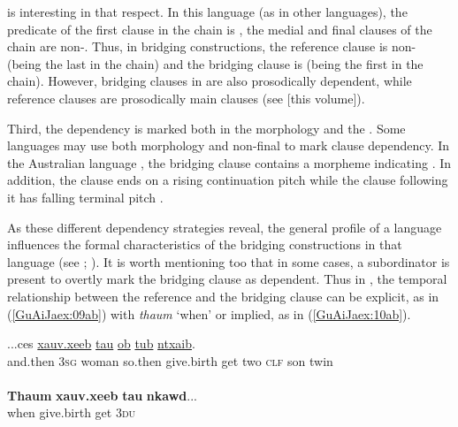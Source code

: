 \documentclass[output=paper]{LSP/langsci}
\begin{document}
 is interesting in that respect. In this language (as in other  languages), the predicate of the first clause in the chain is , the medial and final clauses of the chain are non-. Thus, in  bridging constructions, the reference clause is non- (being the last in the chain) and the bridging clause is  (being the first in the chain). However, bridging clauses in  are also prosodically dependent, while reference clauses are prosodically main clauses (see \citealt{chapters/03Sarvasy} [this volume]).

Third, the dependency is marked both in the morphology and the . Some languages may use both morphology and non-final  to mark clause dependency. In the Australian language , the bridging clause contains a morpheme indicating . In addition, the clause ends on a rising continuation pitch while the clause following it has falling terminal pitch \citep[99]{heath1985}. 

As these different dependency strategies reveal, the general profile of a language influences the formal characteristics of the bridging constructions in that language (see  \citealt{devries.2005}; \citealt[][898]{seifart10}). It is worth mentioning too that in some cases, a subordinator is present to overtly mark the bridging clause as dependent. Thus in , the temporal relationship between the reference and the bridging clause can be explicit, as in (\ref{GuAiJaex:09ab}) with \textit{thaum} `when' or implied, as in (\ref{GuAiJaex:10ab}). 


\begin{exe}
\ex \label{GuAiJaex:09ab}
\begin{xlist}
\ex \label{GuAiJaex:09a}
\gll ...ces \underline{} \underline{} \underline{} \underline{xauv.xeeb} \underline{tau} \underline{ob} \underline{} \underline{tub} \underline{ntxaib}.\\
and.then \textsc{3sg} woman so.then give.birth get two \textsc{clf} son twin\\
\glt {}\\
\ex \label{GuAiJaex:09b}
\gll \textbf{Thaum} \textbf{xauv.xeeb} \textbf{tau} \textbf{nkawd}...\\     	      
    when  give.birth get \textsc{3du}\\
\glt {} 
\end{xlist}
\end{exe}
\end{document}
